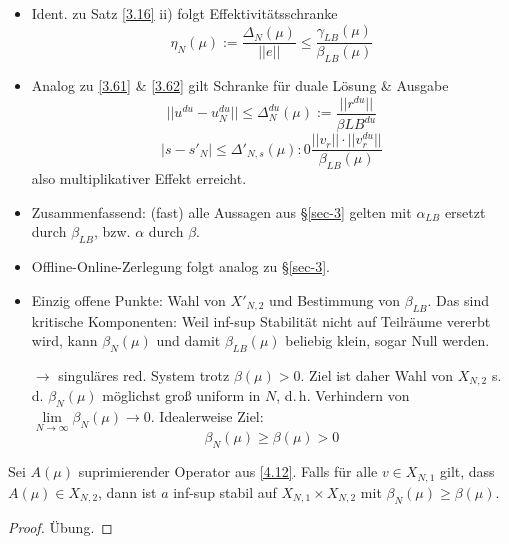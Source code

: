\begin{bem} \beginwithlistbem
	\begin{itemize}
		\item Ident. zu Satz \ref{3.16} ii) folgt Effektivitätsschranke
		\[
			\eta_N(\mu) := \frac{\Delta_N(\mu)}{||e||} \leq \frac{\gamma_{LB}(\mu)}{\beta_{LB}(\mu)}
		\]
		\item Analog zu \ref{3.61} \& \ref{3.62} gilt Schranke für duale Lösung \& Ausgabe
		\[
			||u^{du} - u_N^{du}|| \leq \Delta_N^{du}(\mu) := \frac{||r^{du}||}{\beta{LB}^{du}}
		\]
		\[
			|s - s'_N| \leq \Delta'_{N,s}(\mu) :0 \frac{||v_r|| \cdot ||v_r^{du}||}{\beta_{LB}(\mu)}
		\]
		also multiplikativer Effekt erreicht.
		\item Zusammenfassend: (fast) alle Aussagen aus §\ref{sec-3} gelten mit $\alpha_{LB}$ ersetzt durch $\beta_{LB}$, bzw. $\alpha$ durch $\beta$.
		\item Offline-Online-Zerlegung folgt analog zu §\ref{sec-3}.
		\item Einzig offene Punkte: Wahl von $X'_{N,2}$ und Bestimmung von $\beta_{LB}$. Das sind kritische Komponenten: Weil inf-sup Stabilität nicht auf Teilräume vererbt wird, kann $\beta_N(\mu)$ und damit $\beta_{LB}(\mu)$ beliebig klein, sogar Null werden.
		
		$\rightarrow$ singuläres red. System trotz $\beta(\mu) > 0$. Ziel ist daher Wahl von $X_{N,2}$ s.\,d. $\beta_N(\mu)$ möglichst groß uniform in $N$, d.\,h. Verhindern von $\lim\limits_{N \rightarrow \infty} \beta_N(\mu) \rightarrow 0$. Idealerweise Ziel:
		\[
			\beta_N(\mu) \geq \beta(\mu) > 0
		\]
	\end{itemize}
\end{bem}

\begin{satz} \label{4.20}
Sei $A(\mu)$ suprimierender Operator aus \ref{4.12}. Falls für alle $v \in X_{N,1}$ gilt, dass $A(\mu) \in X_{N,2}$, dann ist $a$ inf-sup stabil auf $X_{N,1} \times X_{N,2}$ mit $\beta_N(\mu) \geq \beta(\mu)$.
\begin{proof}
Übung.
\end{proof}
\end{satz}

